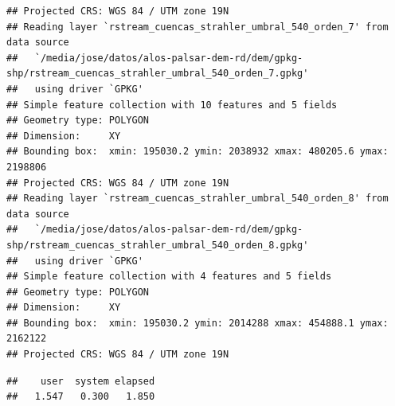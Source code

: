 \documentclass[spanish]{article}
\begin{document}
\begin{verbatim}
## Projected CRS: WGS 84 / UTM zone 19N
## Reading layer `rstream_cuencas_strahler_umbral_540_orden_7' from data source 
##   `/media/jose/datos/alos-palsar-dem-rd/dem/gpkg-shp/rstream_cuencas_strahler_umbral_540_orden_7.gpkg' 
##   using driver `GPKG'
## Simple feature collection with 10 features and 5 fields
## Geometry type: POLYGON
## Dimension:     XY
## Bounding box:  xmin: 195030.2 ymin: 2038932 xmax: 480205.6 ymax: 2198806
## Projected CRS: WGS 84 / UTM zone 19N
## Reading layer `rstream_cuencas_strahler_umbral_540_orden_8' from data source 
##   `/media/jose/datos/alos-palsar-dem-rd/dem/gpkg-shp/rstream_cuencas_strahler_umbral_540_orden_8.gpkg' 
##   using driver `GPKG'
## Simple feature collection with 4 features and 5 fields
## Geometry type: POLYGON
## Dimension:     XY
## Bounding box:  xmin: 195030.2 ymin: 2014288 xmax: 454888.1 ymax: 2162122
## Projected CRS: WGS 84 / UTM zone 19N
\end{verbatim}

\begin{verbatim}
##    user  system elapsed 
##   1.547   0.300   1.850
\end{verbatim}
\end{document}
